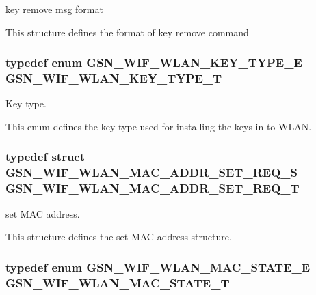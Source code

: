 key remove msg format 

This structure defines the format of key remove command \hypertarget{a00677_gab0871ec1fe022833d9573d32749bd7c4}{
\subsubsection[{GSN\_\-WIF\_\-WLAN\_\-KEY\_\-TYPE\_\-T}]{\setlength{\rightskip}{0pt plus 5cm}typedef enum {\bf GSN\_\-WIF\_\-WLAN\_\-KEY\_\-TYPE\_\-E} {\bf GSN\_\-WIF\_\-WLAN\_\-KEY\_\-TYPE\_\-T}}}
\label{a00677_gab0871ec1fe022833d9573d32749bd7c4}


Key type. 

This enum defines the key type used for installing the keys in to WLAN. \hypertarget{a00677_ga013826a17b7a57eb4c9e4de16a91b6a7}{
\subsubsection[{GSN\_\-WIF\_\-WLAN\_\-MAC\_\-ADDR\_\-SET\_\-REQ\_\-T}]{\setlength{\rightskip}{0pt plus 5cm}typedef struct {\bf GSN\_\-WIF\_\-WLAN\_\-MAC\_\-ADDR\_\-SET\_\-REQ\_\-S}  {\bf GSN\_\-WIF\_\-WLAN\_\-MAC\_\-ADDR\_\-SET\_\-REQ\_\-T}}}
\label{a00677_ga013826a17b7a57eb4c9e4de16a91b6a7}


set MAC address. 

This structure defines the set MAC address structure. \hypertarget{a00677_gabb160daeefaad3c313cfd17480013311}{
\subsubsection[{GSN\_\-WIF\_\-WLAN\_\-MAC\_\-STATE\_\-T}]{\setlength{\rightskip}{0pt plus 5cm}typedef enum {\bf GSN\_\-WIF\_\-WLAN\_\-MAC\_\-STATE\_\-E}  {\bf GSN\_\-WIF\_\-WLAN\_\-MAC\_\-STATE\_\-T}}}
\label{a00677_gabb160daeefaad3c313cfd17480013311}


